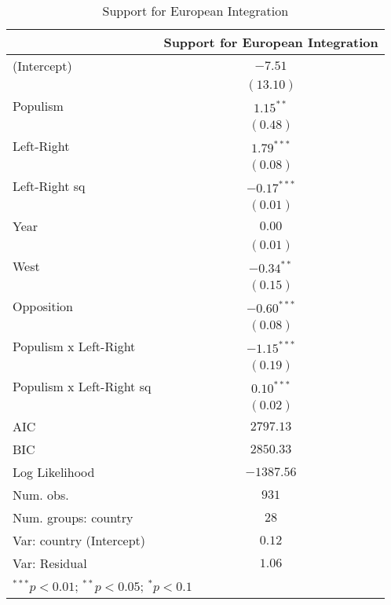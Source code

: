 
\begin{table}
\begin{center}
\begin{tabular}{l c}
\hline
 & Support for European Integration \\
\hline
(Intercept)              & $-7.51$       \\
                         & $(13.10)$     \\
Populism                 & $1.15^{**}$   \\
                         & $(0.48)$      \\
Left-Right               & $1.79^{***}$  \\
                         & $(0.08)$      \\
Left-Right sq            & $-0.17^{***}$ \\
                         & $(0.01)$      \\
Year                     & $0.00$        \\
                         & $(0.01)$      \\
West                     & $-0.34^{**}$  \\
                         & $(0.15)$      \\
Opposition               & $-0.60^{***}$ \\
                         & $(0.08)$      \\
Populism x Left-Right    & $-1.15^{***}$ \\
                         & $(0.19)$      \\
Populism x Left-Right sq & $0.10^{***}$  \\
                         & $(0.02)$      \\
\hline
AIC                      & $2797.13$     \\
BIC                      & $2850.33$     \\
Log Likelihood           & $-1387.56$    \\
Num. obs.                & $931$         \\
Num. groups: country     & $28$          \\
Var: country (Intercept) & $0.12$        \\
Var: Residual            & $1.06$        \\
\hline
\multicolumn{2}{l}{\scriptsize{$^{***}p<0.01$; $^{**}p<0.05$; $^{*}p<0.1$}}
\end{tabular}
\caption{Support for European Integration}
\label{t:CHESPosition}
\end{center}
\end{table}
